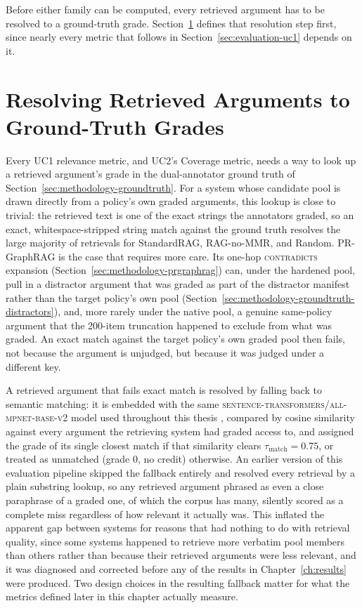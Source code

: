 Before either family can be computed, every retrieved argument has to be resolved to a
ground-truth grade. Section~\ref{sec:evaluation-matching} defines that resolution step first, since
nearly every metric that follows in Section~\ref{sec:evaluation-uc1} depends on it.

\section{Resolving Retrieved Arguments to Ground-Truth Grades}
\label{sec:evaluation-matching}

Every UC1 relevance metric, and UC2's Coverage metric, needs a way to look up a retrieved
argument's grade in the dual-annotator ground truth of
Section~\ref{sec:methodology-groundtruth}. For a system whose candidate pool is drawn directly
from a policy's own graded arguments, this lookup is close to trivial: the retrieved text is one
of the exact strings the annotators graded, so an exact, whitespace-stripped string match against
the ground truth resolves the large majority of retrievals for StandardRAG, RAG-no-MMR, and
Random. PR-GraphRAG is the case that requires more care. Its one-hop \textsc{contradicts}
expansion (Section~\ref{sec:methodology-prgraphrag}) can, under the hardened pool, pull in a
distractor argument that was graded as part of the distractor manifest rather than the target
policy's own pool (Section~\ref{sec:methodology-groundtruth-distractors}), and, more rarely under
the native pool, a genuine same-policy argument that the 200-item truncation happened to exclude
from what was graded. An exact match against the target policy's own graded pool then fails, not
because the argument is unjudged, but because it was judged under a different key.

A retrieved argument that fails exact match is resolved by falling back to semantic matching: it
is embedded with the same \textsc{sentence-transformers/all-mpnet-base-v2} model used throughout
this thesis \cite{reimers2019sbert,song2020mpnet}, compared by cosine similarity against every
argument the retrieving system had graded access to, and assigned the grade of its single closest
match if that similarity clears $\tau_{\text{match}} = 0.75$, or treated as unmatched (grade 0, no
credit) otherwise. An earlier version of this evaluation pipeline skipped the fallback entirely and
resolved every retrieval by a plain substring lookup, so any retrieved argument phrased as even a
close paraphrase of a graded one, of which the corpus has many, silently scored as a complete miss
regardless of how relevant it actually was. This inflated the apparent gap between systems for
reasons that had nothing to do with retrieval quality, since some systems happened to retrieve more
verbatim pool members than others rather than because their retrieved arguments were less relevant,
and it was diagnosed and corrected before any of the results in Chapter~\ref{ch:results} were
produced. Two design choices in the resulting fallback matter for what the metrics defined later in
this chapter actually measure.

